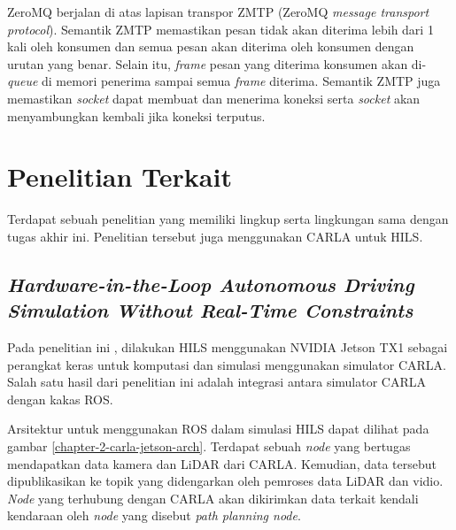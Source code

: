 ZeroMQ berjalan di atas lapisan transpor ZMTP (ZeroMQ \textit{message transport
	protocol}). Semantik ZMTP memastikan pesan tidak akan diterima lebih dari 1 kali
oleh konsumen dan semua pesan akan diterima oleh konsumen dengan urutan yang
benar. Selain itu, \textit{frame} pesan yang diterima konsumen akan
di-\textit{queue} di memori penerima sampai semua \textit{frame} diterima.
Semantik ZMTP juga memastikan \textit{socket} dapat membuat dan menerima koneksi
serta \textit{socket} akan menyambungkan kembali jika koneksi terputus.

\section{Penelitian Terkait}

Terdapat sebuah penelitian yang memiliki lingkup serta lingkungan sama dengan
tugas akhir ini. Penelitian tersebut juga menggunakan CARLA untuk HILS.

\subsection{\textit{Hardware-in-the-Loop Autonomous Driving Simulation Without
		Real-Time Constraints}}

Pada penelitian ini \parencite{brogle_CarlaHILS}, dilakukan HILS menggunakan
NVIDIA Jetson TX1 sebagai perangkat keras untuk komputasi dan simulasi
menggunakan simulator CARLA. Salah satu hasil dari penelitian ini adalah
integrasi antara simulator CARLA dengan kakas ROS.

Arsitektur untuk menggunakan ROS dalam simulasi HILS dapat dilihat pada gambar
\ref{chapter-2-carla-jetson-arch}. Terdapat sebuah \textit{node}  yang
bertugas mendapatkan data kamera dan LiDAR dari CARLA. Kemudian, data tersebut
dipublikasikan ke topik yang didengarkan oleh pemroses data LiDAR dan vidio.
\textit{Node} yang terhubung dengan CARLA akan dikirimkan data terkait kendali
kendaraan oleh \textit{node} yang disebut \textit{path planning node}.


